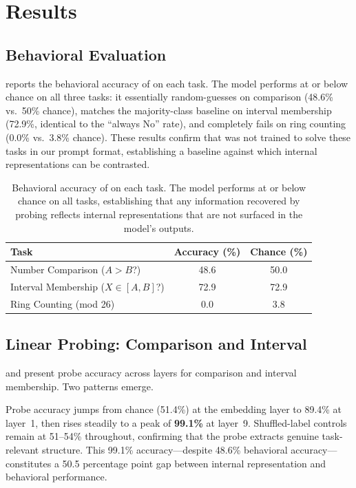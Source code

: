 \section{Results}
\label{sec:results}

\subsection{Behavioral Evaluation}
\label{sec:behavioral}

 reports the behavioral accuracy of \gptsmall on each task. The model performs at or below chance on all three tasks: it essentially random-guesses on comparison (48.6\% vs.\ 50\% chance), matches the majority-class baseline on interval membership (72.9\%, identical to the ``always No'' rate), and completely fails on ring counting (0.0\% vs.\ 3.8\% chance). These results confirm that \gptsmall was not trained to solve these tasks in our prompt format, establishing a baseline against which internal representations can be contrasted.

\begin{table}[t]
\centering
\caption{Behavioral accuracy of \gptsmall on each task. The model performs at or below chance on all tasks, establishing that any information recovered by probing reflects internal representations that are not surfaced in the model's outputs.}
\label{tab:behavioral}
\begin{tabular}{@{}lcc@{}}
\toprule
\textbf{Task} & \textbf{Accuracy (\%)} & \textbf{Chance (\%)} \\
\midrule
Number Comparison ($A > B$?) & 48.6 & 50.0 \\
Interval Membership ($X \in [A,B]$?) & 72.9 & 72.9 \\
Ring Counting (mod 26) & 0.0 & 3.8 \\
\bottomrule
\end{tabular}
\end{table}

\subsection{Linear Probing: Comparison and Interval}
\label{sec:probing_results}

 and  present probe accuracy across layers for comparison and interval membership. Two patterns emerge.

 Probe accuracy jumps from chance (51.4\%) at the embedding layer to 89.4\% at layer~1, then rises steadily to a peak of \textbf{99.1\%} at layer~9. Shuffled-label controls remain at 51--54\% throughout, confirming that the probe extracts genuine task-relevant structure. This 99.1\% accuracy---despite 48.6\% behavioral accuracy---constitutes a 50.5 percentage point gap between internal representation and behavioral performance.

